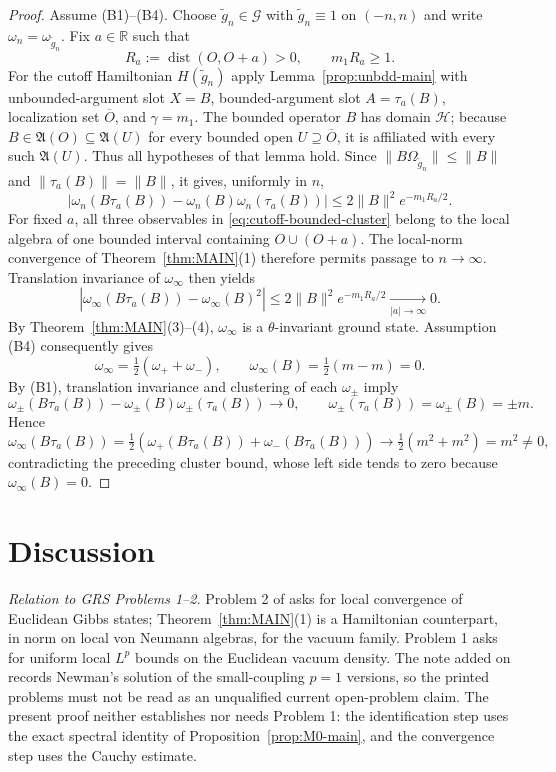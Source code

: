 \documentclass[11pt,a4paper]{article}
\theoremstyle{plain}
\theoremstyle{definition}
\newcommand{\R}{\mathbb{R}}
\newcommand{\A}{\mathfrak{A}}
\newcommand{\G}{\mathcal{G}}
\newcommand{\HH}{\mathcal{H}}
\newcommand{\Om}{\Omega}
\DeclareMathOperator{\dist}{dist}
\begin{document}
\begin{proof}
Assume (B1)--(B4). Choose $\widetilde g_n\in\G$ with
$\widetilde g_n\equiv1$ on $(-n,n)$ and write $\omega_n=\omega_{\widetilde g_n}$. Fix
$a\in\R$ such that
\[
 R_a:=\dist(O,O+a)>0,\qquad m_1R_a\ge1.
\]
For the cutoff Hamiltonian $H(\widetilde g_n)$ apply Lemma~\ref{prop:unbdd-main} with
unbounded-argument slot $X=B$, bounded-argument slot $A=\tau_a(B)$, localization set
$\overline O$, and $\gamma=m_1$. The bounded operator $B$ has domain $\HH$; because
$B\in\A(O)\subseteq\A(U)$ for every bounded open $U\supseteq\overline O$, it is affiliated
with every such $\A(U)$. Thus all hypotheses of that lemma hold. Since
$\|B\Om_{\widetilde g_n}\|\le\|B\|$ and $\|\tau_a(B)\|=\|B\|$, it gives, uniformly in $n$,
\begin{equation}\label{eq:cutoff-bounded-cluster}
 \left|\omega_n(B\tau_a(B))-\omega_n(B)\omega_n(\tau_a(B))\right|
 \le2\|B\|^2e^{-m_1R_a/2}.
\end{equation}
For fixed $a$, all three observables in \eqref{eq:cutoff-bounded-cluster} belong to the local
algebra of one bounded interval containing $O\cup(O+a)$. The local-norm convergence of
Theorem~\ref{thm:MAIN}(1) therefore permits passage to $n\to\infty$. Translation invariance
of $\omega_\infty$ then yields
\[
 \left|\omega_\infty(B\tau_a(B))-\omega_\infty(B)^2\right|
 \le2\|B\|^2e^{-m_1R_a/2}\xrightarrow[|a|\to\infty]{}0.
\]
By Theorem~\ref{thm:MAIN}(3)--(4), $\omega_\infty$ is a $\theta$-invariant ground state.
Assumption (B4) consequently gives
\[
 \omega_\infty=\tfrac12(\omega_++\omega_-),\qquad
 \omega_\infty(B)=\tfrac12(m-m)=0.
\]
By (B1), translation invariance and clustering of each $\omega_\pm$ imply
\[
 \omega_\pm(B\tau_a(B))
 -\omega_\pm(B)\omega_\pm(\tau_a(B))\longrightarrow0,\qquad
 \omega_\pm(\tau_a(B))=\omega_\pm(B)=\pm m.
\]
Hence
\[
 \omega_\infty(B\tau_a(B))
 =\tfrac12\!\left(\omega_+(B\tau_a(B))+\omega_-(B\tau_a(B))\right)
 \longrightarrow\tfrac12(m^2+m^2)=m^2\ne0,
\]
contradicting the preceding cluster bound, whose left side tends to zero because
$\omega_\infty(B)=0$.
\end{proof}

\section{Discussion}\label{sec:discussion}

\emph{Relation to GRS Problems 1--2.} Problem 2 of \cite[p.~126]{GRS75} asks for local
convergence of Euclidean Gibbs states; Theorem~\ref{thm:MAIN}(1) is a Hamiltonian counterpart,
in norm on local von Neumann algebras, for the vacuum family. Problem 1 asks for uniform local
$L^p$ bounds on the Euclidean vacuum density. The note added on \cite[p.~128]{GRS75} records
Newman's solution of the small-coupling $p=1$ versions, so the printed problems must not be read
as an unqualified current open-problem claim. The present proof neither establishes nor needs
Problem 1: the identification step uses the exact spectral identity of
Proposition~\ref{prop:M0-main}, and the convergence step uses the Cauchy estimate.
\end{document}
